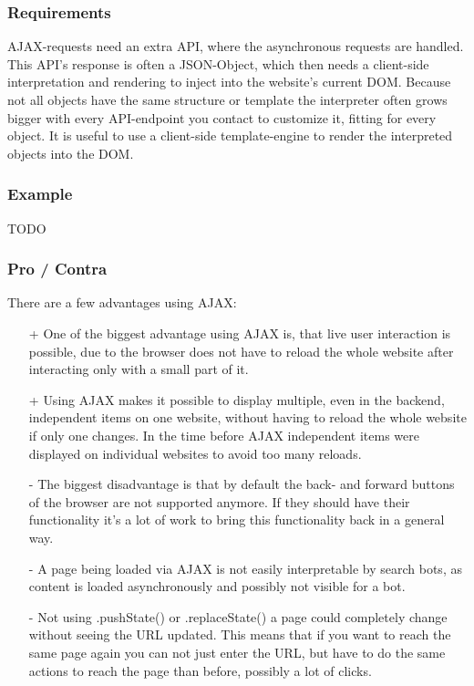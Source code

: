 \documentclass[f,bachelor,binding,twoside,palatino]{WeSTthesis}
\begin{document}
    \subsubsection{Requirements}
    \gls{AJAX}-requests need an extra API, where the asynchronous requests are handled.
    This API's response is often a JSON-Object, which then needs a client-side interpretation and rendering to inject into the website's current DOM.
    Because not all objects have the same structure or template the interpreter often grows bigger with every API-endpoint you contact to customize it, fitting for every object.
    It is useful to use a client-side template-engine to render the interpreted objects into the DOM.

    \subsubsection{Example}
    TODO

    \subsubsection{Pro / Contra}
  	  There are a few advantages using \gls{AJAX}:
  	  \begin{itemize}
        \item[+]{One of the biggest advantage using \gls{AJAX} is, that live user interaction is possible, due to the browser does not have to reload the whole website after interacting only with a small part of it.}
  	    \item[+]{Using \gls{AJAX} makes it possible to display multiple, even in the backend, independent items on one website, without having to reload the whole website if only one changes.
  	    In the time before \gls{AJAX} independent items were displayed on individual websites to avoid too many reloads.}
  	    \item[-]{The biggest disadvantage is that by default the back- and forward buttons of the browser are not supported anymore.
  	    If they should have their functionality it's a lot of work to bring this functionality back in a general way.}
  	    \item[-]{A page being loaded via \gls{AJAX} is not easily interpretable by search bots, as content is loaded asynchronously and possibly not visible for a bot.}
  	    \item[-]{Not using .pushState() or .replaceState() a page could completely change without seeing the URL updated.
  	    This means that if you want to reach the same page again you can not just enter the URL, but have to do the same actions to reach the page than before, possibly a lot of clicks.}
  	  \end{itemize}
\end{document}
